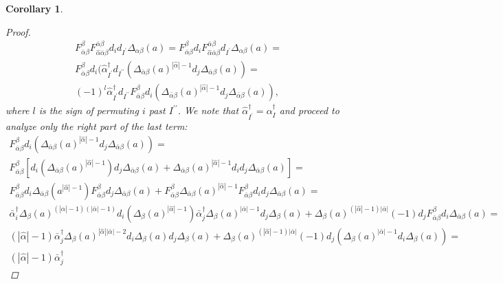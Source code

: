 \documentclass[10pt, a4paper, UKenglish]{article}
\numberwithin{equation}{section}
\newcommand{\abs}[1]{\left\vert#1\right\vert}	%
\theoremstyle{plain}
\newtheorem{cor}[equation]{Corollary}
\theoremstyle{definition}
\begin{document}
\begin{cor}
\begin{proof}
\begin{gather*}
	F_{\bar\alpha\beta}^{\beta} F^{\bar\alpha\beta}_{\hat\alpha\bar\alpha\beta} d_i  d_{I^\prime} \Delta_{\alpha\beta}(a) = %
	F_{\bar\alpha\beta}^{\beta} d_i F^{\bar\alpha\beta}_{\hat\alpha\bar\alpha\beta}%
		d_{I^\prime} \Delta_{\alpha\beta}(a) = \\%
	F_{\bar\alpha\beta}^{\beta} d_i ( \hat\alpha^\dagger_{I^\prime} d_{I^{\prime\prime}}%
		( \Delta_{\bar\alpha\beta}(a)^{\abs{\hat\alpha}-1} %
		d_j \Delta_{\bar\alpha\beta}(a) ) = \\%
	(-1)^l \hat\alpha^\dagger_{I^\prime} d_{I^{\prime\prime}} F_{\bar\alpha\beta}^\beta %
		d_i ( \Delta_{\bar\alpha\beta}(a)^{\abs{\hat\alpha}-1} %
		d_j \Delta_{\bar\alpha\beta}(a) ),%
\end{gather*}
where $l$ is the sign of permuting $i$ past $I^{\prime\prime}$. We note that $\hat\alpha^\dagger_{I^\prime} = \alpha^\dagger_I$ and proceed to analyze only the right part of the last term:
\begin{gather*}
	F_{\bar\alpha\beta}^\beta d_i ( \Delta_{\bar\alpha\beta}(a)^{\abs{\hat\alpha}-1} %
		d_j \Delta_{\bar\alpha\beta}(a) ) = \\%
	F_{\bar\alpha\beta}^\beta \left[ %
    d_i ( \Delta_{\bar\alpha\beta}(a)^{\abs{\hat\alpha}-1} )%
    d_j \Delta_{\bar\alpha\beta}(a) + %
		\Delta_{\bar\alpha\beta}(a)^{\abs{\hat\alpha}-1} %
		d_i d_j \Delta_{\bar\alpha\beta}(a) \right] = \\
	F_{\bar\alpha\beta}^\beta d_i \Delta_{\bar\alpha\beta}(a^{\abs{\hat\alpha}-1}) %
    F_{\bar\alpha\beta}^\beta d_j \Delta_{\bar\alpha\beta}(a) + %
    F_{\bar\alpha\beta}^\beta \Delta_{\bar\alpha\beta}(a)^{\abs{\hat\alpha}-1} %
    F_{\bar\alpha\beta}^\beta d_i d_j \Delta_{\bar\alpha\beta}(a) = \\%
  \bar\alpha^\dagger_i %
    \Delta_{\beta} (a)^{(\abs{\hat\alpha}-1)(\abs{\bar\alpha}-1)} %
    d_i (\Delta_{\beta} (a)^{\abs{\hat\alpha}-1}) %
    \bar\alpha^\dagger_j %
    \Delta_{\beta} (a)^{\abs{\bar\alpha}-1} %
    d_j \Delta_\beta (a) %
    + %
    \Delta_\beta(a)^{(\abs{\hat\alpha}-1)\abs{\bar\alpha}} %
    (-1) d_j F_{\bar\alpha\beta}^\beta %
    d_i \Delta_{\bar\alpha\beta}(a) = \\%
  (\abs{\hat\alpha}-1)\bar\alpha^\dagger_j%
    \Delta_\beta(a)^{\abs{\hat\alpha}\abs{\bar\alpha} - 2} %
    d_i \Delta_\beta(a) d_j \Delta_\beta (a) %
    + %
    \Delta_\beta(a)^{(\abs{\hat\alpha}-1)\abs{\bar\alpha}} %
    (-1) d_j ( \Delta_\beta(a)^{\abs{\bar\alpha}-1} %
    d_i \Delta_\beta(a) ) = \\%
  (\abs{\hat\alpha}-1)\bar\alpha^\dagger_j%

\end{gather*}
\end{proof}
\end{cor}
\end{document}
